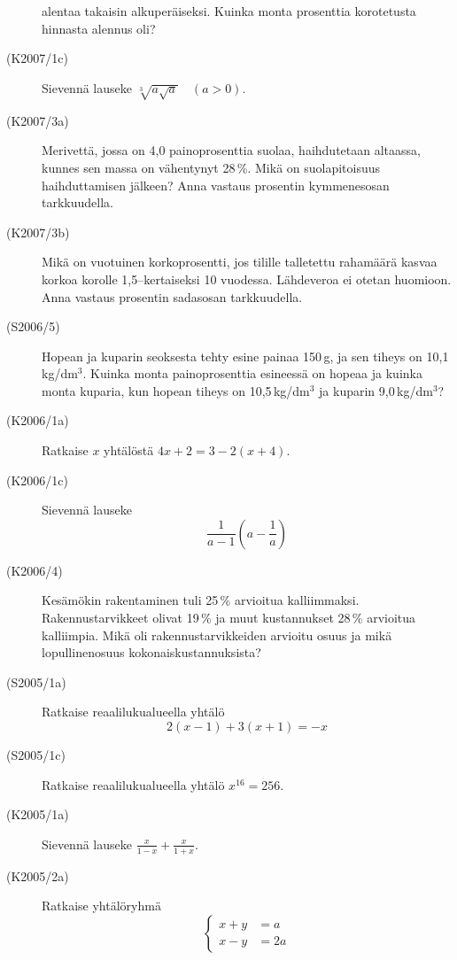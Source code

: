 \begin{description}
                       alentaa takaisin alkuperäiseksi. Kuinka monta prosenttia korotetusta hinnasta alennus oli?
    \item[(K2007/1c)]  Sievennä lauseke $ \sqrt[3]{a \sqrt{a}} \quad (a > 0) $.
    \item[(K2007/3a)]  Merivettä, jossa on 4,0 painoprosenttia suolaa, haihdutetaan altaassa, kunnes sen massa on
                       vähentynyt 28\,\%. Mikä on suolapitoisuus haihduttamisen jälkeen? Anna vastaus prosentin
                       kymmenesosan tarkkuudella. 
    \item[(K2007/3b)]  Mikä on vuotuinen korkoprosentti, jos tilille talletettu rahamäärä kasvaa korkoa korolle 1,5--kertaiseksi
                       10 vuodessa. Lähdeveroa ei otetan huomioon. Anna vastaus prosentin sadasosan tarkkuudella.
    \item[(S2006/5)]   Hopean ja kuparin seoksesta tehty esine painaa 150\,g, ja sen tiheys on 10,1\,kg/dm\(^3\). Kuinka monta
                       painoprosenttia esineessä on hopeaa ja kuinka monta kuparia, kun hopean tiheys on 10,5\,kg/dm\(^3\) ja kuparin
                       9,0\,kg/dm\(^3\)?
    \item[(K2006/1a)]  Ratkaise $x$ yhtälöstä $4x + 2 =  3 - 2(x + 4)$.
    \item[(K2006/1c)]  Sievennä lauseke 
                       \[ \frac{1}{a - 1} \left( a - \frac{1}{a} \right) \]
    \item[(K2006/4)]   Kesämökin rakentaminen tuli 25\,\% arvioitua kalliimmaksi. Rakennustarvikkeet olivat 19\,\% ja muut
                       kustannukset 28\,\% arvioitua kalliimpia. Mikä oli rakennustarvikkeiden arvioitu osuus ja mikä
                       lopullinenosuus kokonaiskustannuksista?
    \item[(S2005/1a)]  Ratkaise reaalilukualueella yhtälö 
                        \[2(x - 1) + 3(x + 1 ) = -x \]
    \item[(S2005/1c)]  Ratkaise reaalilukualueella yhtälö $ x^{16} = 256 $.
    \item[(K2005/1a)]  Sievennä lauseke $ \frac{x}{1 - x} + \frac{x}{1 + x} $.
    \item[(K2005/2a)]  Ratkaise yhtälöryhmä
                       \[
                         \left\{
                         \begin{matrix}
                              x + y &= a \\
                              x - y &= 2a
                         \end{matrix}
\]
\end{description}
